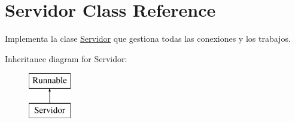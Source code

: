 \hypertarget{classServidor}{}\section{Servidor Class Reference}
\label{classServidor}


Implementa la clase \hyperlink{classServidor}{Servidor} que gestiona todas las conexiones y los trabajos.  


Inheritance diagram for Servidor\+:\begin{figure}[H]
\begin{center}
\leavevmode
\includegraphics[height=2.000000cm]{classServidor}
\end{center}
\end{figure}
